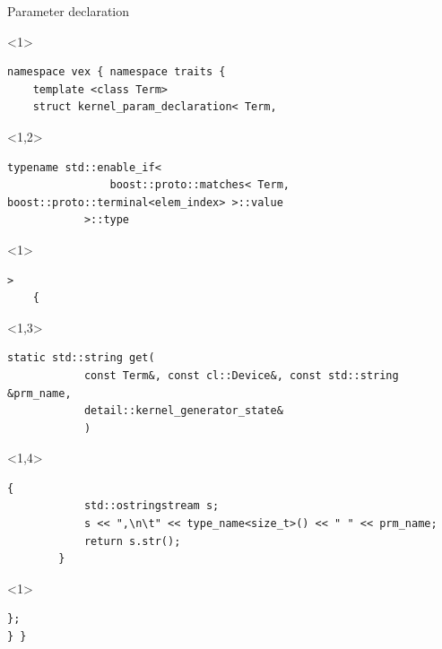 \documentclass[@BEAMER_OPTIONS@]{beamer}
\begin{document}
\begin{frame}[fragile]{Parameter declaration}
    \begin{exampleblock}{}
        \begin{uncoverenv}<1>
            \begin{lstlisting}
namespace vex { namespace traits {
    template <class Term>
    struct kernel_param_declaration< Term,
            \end{lstlisting}
        \end{uncoverenv}
        \begin{uncoverenv}<1,2>
            \begin{lstlisting}[firstnumber=last]
            typename std::enable_if<
                boost::proto::matches< Term, boost::proto::terminal<elem_index> >::value
            >::type
            \end{lstlisting}
        \end{uncoverenv}
        \begin{uncoverenv}<1>
            \begin{lstlisting}[firstnumber=last]
        >
    {
            \end{lstlisting}
        \end{uncoverenv}
        \begin{uncoverenv}<1,3>
            \begin{lstlisting}[firstnumber=last]
        static std::string get(
            const Term&, const cl::Device&, const std::string &prm_name,
            detail::kernel_generator_state&
            )
            \end{lstlisting}
        \end{uncoverenv}
        \begin{uncoverenv}<1,4>
            \begin{lstlisting}[firstnumber=last]
        {
            std::ostringstream s;
            s << ",\n\t" << type_name<size_t>() << " " << prm_name;
            return s.str();
        }
            \end{lstlisting}
        \end{uncoverenv}
        \begin{uncoverenv}<1>
            \begin{lstlisting}[firstnumber=last]
    };
} }
            \end{lstlisting}
        \end{uncoverenv}
    \end{exampleblock}
\end{frame}
\end{document}
